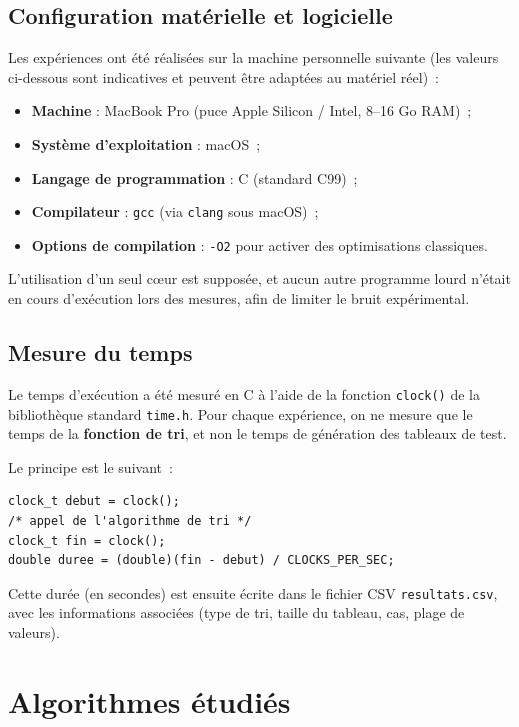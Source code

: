 \documentclass[11pt,a4paper]{article}
\begin{document}
\subsection{Configuration matérielle et logicielle}

Les expériences ont été réalisées sur la machine personnelle suivante
(les valeurs ci-dessous sont indicatives et peuvent être adaptées au
matériel réel)~:

\begin{itemize}
  \item \textbf{Machine} : MacBook Pro (puce Apple Silicon / Intel, 8--16 Go RAM)~;
  \item \textbf{Système d'exploitation} : macOS~;
  \item \textbf{Langage de programmation} : C (standard C99)~;
  \item \textbf{Compilateur} : \texttt{gcc} (via \texttt{clang} sous macOS)~;
  \item \textbf{Options de compilation} : \texttt{-O2} pour activer des
        optimisations classiques.
\end{itemize}

L'utilisation d'un seul cœur est supposée, et aucun autre programme
lourd n'était en cours d'exécution lors des mesures, afin de limiter le
bruit expérimental.

\subsection{Mesure du temps}

Le temps d'exécution a été mesuré en C à l'aide de la fonction
\texttt{clock()} de la bibliothèque standard \texttt{time.h}.  
Pour chaque expérience, on ne mesure que le temps de la \textbf{fonction
de tri}, et non le temps de génération des tableaux de test.

Le principe est le suivant~:

\begin{verbatim}
clock_t debut = clock();
/* appel de l'algorithme de tri */
clock_t fin = clock();
double duree = (double)(fin - debut) / CLOCKS_PER_SEC;
\end{verbatim}

Cette durée (en secondes) est ensuite écrite dans le fichier CSV
\texttt{resultats.csv}, avec les informations associées
(type de tri, taille du tableau, cas, plage de valeurs).

\section{Algorithmes étudiés}
\end{document}
